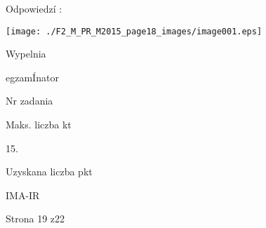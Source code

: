 \documentclass[a4paper,12pt]{article}
\begin{document}
Odpowiedzí :
\begin{center}
\texttt{[image: ./F2\_M\_PR\_M2015\_page18\_images/image001.eps]}
\end{center}
Wypelnia

egzamÍnator

Nr zadania

Maks. liczba kt

15.

Uzyskana liczba pkt

IMA-IR

Strona 19 z22
\end{document}
